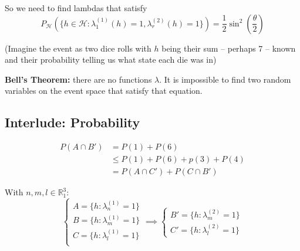 \documentclass[12pt]{article}
\newcommand{\R}{\mathbb{R}}
\begin{document}
        So we need to find lambdas that satisfy 
        \[P_{\mathcal{H}}(\{h\in \mathcal{H}: \lambda_1^{(1)}(h) = 1, \lambda_r^{(2)}(h) = 1\}) = \frac{1}{2}\sin^2(\frac{\theta}{2})\]

        (Imagine the event as two dice rolls with $h$ being their sum -- perhaps 7 -- known and their probability telling us what state each die was in)

        \textbf{Bell's Theorem:} there are no functions $\lambda$. It is impossible to find two random variables on the event space that satisfy that equation.

    \subsection*{Interlude: Probability}
        \begin{center}
        \end{center}    
    

        \begin{align*}
            P(A\cap B') &= P(1) + P(6)\\
            &\leq P(1) + P(6) + p(3) + P(4)\\
            &= P(A \cap C') + P(C \cap B')
        \end{align*}

        With $n, m, l \in \R_1^3$: 
        \[\begin{cases}
            A = \{h: \lambda_n^{(1)} = 1\}\\
            B = \{h: \lambda_m^{(1)} = 1\}\\
            C = \{h: \lambda_l^{(1)} = 1\}\\
        \end{cases} \implies \begin{cases}
            B' = \{h: \lambda_m^{(2)} = 1\}\\
            C' = \{h: \lambda_l^{(2)} = 1\}
        \end{cases}\]
\end{document}
